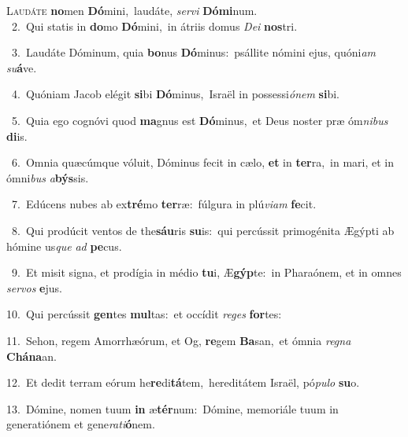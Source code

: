 \lettrine{\initial\textcolor{\initialcolor}{L}}{audáte} \textbf{no}\-men \textbf{Dó}\-mini,~\star laudáte, \textit{ser}\-\textit{vi} \textbf{Dó}\-\textbf{mi}num.\\
{\numbfont\textcolor{\numbcolor}{~2.}}~Qui statis in \textbf{do}\-mo \textbf{Dó}\-mini,~\star in átriis domus \textit{De}\-\textit{i} \textbf{nos}\-tri.\par
{\numbfont\textcolor{\numbcolor}{~3.}}~Laudáte Dóminum, quia \textbf{bo}\-nus \textbf{Dó}\-minus:~\star psállite nómini ejus, quóni\textit{am} \textit{su}\-\textbf{á}ve.\par
{\numbfont\textcolor{\numbcolor}{~4.}}~Quóniam Jacob elégit \textbf{si}\-bi \textbf{Dó}\-minus,~\star Israël in possessi\-\textit{ó}\-\textit{nem} \textbf{si}\-bi.\par
{\numbfont\textcolor{\numbcolor}{~5.}}~Quia ego cognóvi quod \textbf{ma}\-gnus est \textbf{Dó}\-minus,~\star et Deus noster præ óm\-\textit{ni}\-\textit{bus} \textbf{di}\-is.\par
{\numbfont\textcolor{\numbcolor}{~6.}}~Omnia quæcúmque vóluit, Dóminus fecit in cælo, \textbf{et} in \textbf{ter}\-ra,~\star in mari, et in ómni\textit{bus} \textit{a}\-\textbf{býs}sis.\par
{\numbfont\textcolor{\numbcolor}{~7.}}~Edúcens nubes ab ex\-\textbf{tré}\-mo \textbf{ter}\-ræ:~\star fúlgura in plú\-\textit{vi}\-\textit{am} \textbf{fe}\-cit.\par
{\numbfont\textcolor{\numbcolor}{~8.}}~Qui prodúcit ventos de the\-\textbf{sáu}\-ris \textbf{su}\-is:~\star qui percússit primogénita Ægýpti ab hómine us\textit{que} \textit{ad} \textbf{pe}\-cus.\par
{\numbfont\textcolor{\numbcolor}{~9.}}~Et misit signa, et prodígia in médio \textbf{tu}\-i, Æ\-\textbf{gýp}\-te:~\star in Pharaónem, et in omnes \textit{ser}\-\textit{vos} \textbf{e}\-jus.\par
{\numbfont\textcolor{\numbcolor}{10.}}~Qui percússit \textbf{gen}\-tes \textbf{mul}\-tas:~\star et occídit \textit{re}\-\textit{ges} \textbf{for}\-tes:\par
{\numbfont\textcolor{\numbcolor}{11.}}~Sehon, regem Amorrhæórum, et Og, \textbf{re}\-gem \textbf{Ba}\-san,~\star et ómnia \textit{re}\-\textit{gna} \textbf{Chá}\-\textbf{na}an.\par
{\numbfont\textcolor{\numbcolor}{12.}}~Et dedit terram eórum he\-\textbf{re}\-di\-\textbf{tá}\-tem,~\star hereditátem Israël, pó\-\textit{pu}\-\textit{lo} \textbf{su}\-o.\par
{\numbfont\textcolor{\numbcolor}{13.}}~Dómine, nomen tuum \textbf{in} æ\-\textbf{tér}\-num:~\star Dómine, memoriále tuum in generatiónem et gene\-\textit{ra}\-\textit{ti}\textbf{ó}nem.\par
